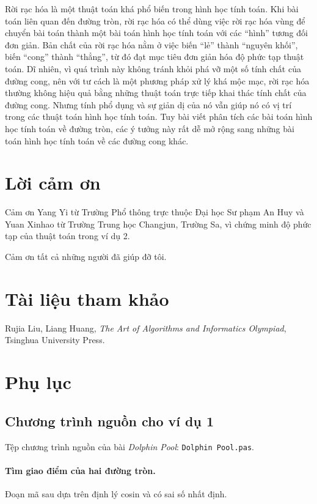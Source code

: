 \documentclass[11pt]{article}
\begin{document}
Rời rạc hóa là một thuật toán khá phổ biến trong hình học tính toán. Khi bài
toán liên quan đến đường tròn, rời rạc hóa có thể dùng việc rời rạc hóa vùng
để chuyển bài toán thành một bài toán hình học tính toán với các ``hình'' tương
đối đơn giản. Bản chất của rời rạc hóa nằm ở việc biến ``lẻ'' thành ``nguyên
khối'', biến ``cong'' thành ``thẳng'', từ đó đạt mục tiêu đơn giản hóa độ phức
tạp thuật toán. Dĩ nhiên, vì quá trình này không tránh khỏi phá vỡ một số tính
chất của đường cong, nên với tư cách là một phương pháp xử lý khá mộc mạc, rời
rạc hóa thường không hiệu quả bằng những thuật toán trực tiếp khai thác tính
chất của đường cong. Nhưng tính phổ dụng và sự giản dị của nó vẫn giúp nó có
vị trí trong các thuật toán hình học tính toán. Tuy bài viết phân tích các bài
toán hình học tính toán về đường tròn, các ý tưởng này rất dễ mở rộng sang
những bài toán hình học tính toán về các đường cong khác.

\section*{Lời cảm ơn}

Cảm ơn Yang Yi từ Trường Phổ thông trực thuộc Đại học Sư phạm An Huy và Yuan
Xinhao từ Trường Trung học Changjun, Trường Sa, vì chứng minh độ phức tạp của
thuật toán trong ví dụ 2.

Cảm ơn tất cả những người đã giúp đỡ tôi.

\section*{Tài liệu tham khảo}

Rujia Liu, Liang Huang, \textit{The Art of Algorithms and Informatics
Olympiad}, Tsinghua University Press.

\appendix
\section{Phụ lục}

\subsection{Chương trình nguồn cho ví dụ 1}

Tệp chương trình nguồn của bài \textit{Dolphin Pool}: \texttt{Dolphin Pool.pas}.

\paragraph{Tìm giao điểm của hai đường tròn.}
Đoạn mã sau dựa trên định lý cosin và có sai số nhất định.
\end{document}
